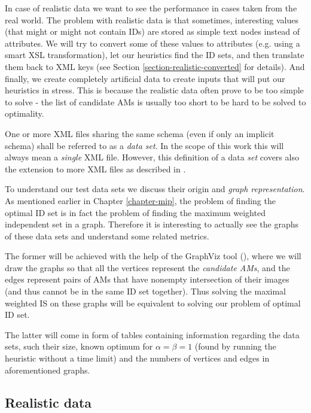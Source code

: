 In case of realistic data we want to see the performance in cases taken from the real world. The problem with realistic data is that sometimes, interesting values (that might or might not contain IDs) are stored as simple text nodes instead of attributes. We will try to convert some of these values to attributes (e.g. using a smart XSL transformation), let our heuristics find the ID sets, and then translate them back to XML keys (see Section \ref{section-realistic-converted} for details).
And finally, we create completely artificial data to create inputs that will put our heuristics in stress. This is because the realistic data often prove to be too simple to solve - the list of candidate AMs is usually too short to be hard to be solved to optimality.

\begin{define}
	\label{define-data-set}
	One or more XML files sharing the same schema (even if only an implicit schema) shall be referred to as a \textit{data set}. In the scope of this work this will always mean a \textit{single} XML file. However, this definition of a data \textit{set} covers also the extension to more XML files as described in \cite{fidax}.
\end{define}

To understand our test data sets we discuss their origin and \textit{graph representation}. As mentioned earlier in Chapter \ref{chapter-mip}, the problem of finding the optimal ID set is in fact the problem of finding the maximum weighted independent set in a graph. Therefore it is interesting to actually see the graphs of these data sets and understand some related metrics.

The former will be achieved with the help of the GraphViz tool (\cite{graphviz}), where we will draw the graphs so that all the vertices represent the \textit{candidate AMs}, and the edges represent pairs of AMs that have nonempty intersection of their images (and thus cannot be in the same ID set together). Thus solving the maximal weighted IS on these graphs will be equivalent to solving our problem of optimal ID set.

The latter will come in form of tables containing information regarding the data sets, such their size, known optimum for $\alpha = \beta = 1$ (found by running the  heuristic without a time limit) and the numbers of vertices and edges in aforementioned graphs.

\subsection{Realistic data}
\label{section-realistic-data}

